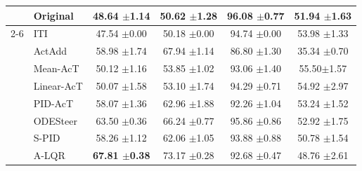 \documentclass{article}
\theoremstyle{plain}
\theoremstyle{definition}
\theoremstyle{remark}
\begin{document}
\begin{table}[H]
\begin{threeparttable}
\begin{tabular}{ll|>{\columncolor{lightblue}}ccc|c}
    \midrule
    
    & Original &  48.64 {\tiny $\pm$1.14} & 50.62 {\tiny $\pm$1.28} & 96.08 {\tiny $\pm$0.77} & 51.94 {\tiny $\pm$1.63} \\
    \cmidrule(lr){2-6}
    \multirow{7}{*}{\rotatebox{90}{Gemma-2-2B}} 
    & ITI & 47.54 {\tiny $\pm$0.00} & 50.18 {\tiny $\pm$0.00} & 94.74 {\tiny $\pm$0.00} & 53.98 {\tiny $\pm$1.33}\\
    & ActAdd & 58.98 {\tiny $\pm$1.74} & 67.94 {\tiny $\pm$1.14} & 86.80 {\tiny $\pm$1.30} & 35.34 {\tiny $\pm$0.70} \\
    & Mean-AcT & 50.12 {\tiny $\pm$1.16} & 53.85 {\tiny $\pm$1.02} & 93.06 {\tiny $\pm$1.40} & 55.50{\tiny $\pm$1.57} \\
    & Linear-AcT & 50.07 {\tiny $\pm$1.58} & 53.10 {\tiny $\pm$1.74} & 94.29 {\tiny $\pm$0.71} & 54.92 {\tiny $\pm$2.97} \\
    & PID-AcT & 58.07 {\tiny $\pm$1.36} & 62.96 {\tiny $\pm$1.88} & 92.26 {\tiny $\pm$1.04} & 53.24 {\tiny $\pm$1.52}\\
    & ODESteer & 63.50 {\tiny $\pm$0.36} & 66.24 {\tiny $\pm$0.77} & 95.86 {\tiny $\pm$0.86} & 52.92 {\tiny $\pm$1.75} \\
    & S-PID & 58.26 {\tiny $\pm$1.12} & 62.06 {\tiny $\pm$1.05} & 93.88 {\tiny $\pm$0.88} &  50.78 {\tiny $\pm$1.54}\\
    & A-LQR & \textbf{67.81 {\tiny $\pm$0.38}} & 73.17 {\tiny $\pm$0.28} & 92.68 {\tiny $\pm$0.47} & 48.76 {\tiny $\pm$2.61} \\

    \midrule
    

\end{tabular}
\end{threeparttable}
\end{table}
\end{document}
